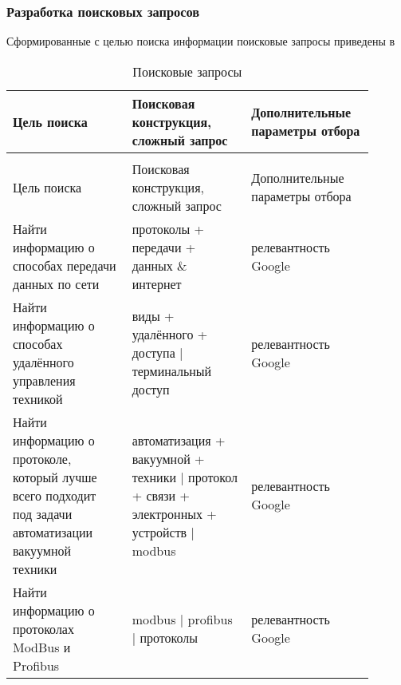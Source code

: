 \subsubsection{Разработка поисковых запросов}
Сформированные с целью поиска информации поисковые запросы приведены в 


\begin{center}
	\begin{longtable}{|C{0.3\linewidth}|C{0.3\linewidth}|C{0.3\linewidth}|}
		\caption{Поисковые запросы}
		\label{tab:search}\\
		\hline
		\bfseries  Цель поиска &\bfseries Поисковая конструкция, сложный запрос& \bfseries Дополнительные параметры отбора\\
		\endfirsthead
		\cpt\\
		\hline
		Цель поиска& Поисковая конструкция, сложный запрос& Дополнительные параметры отбора\\
		\endhead
		\hline
		Найти информацию о способах передачи данных по сети &протоколы + передачи + данных \& интернет&релевантность Google\\
		\hline
		Найти информацию о способах удалённого управления техникой&виды + удалённого + доступа | терминальный доступ&релевантность Google\\
		\hline
		Найти информацию о протоколе, который лучше всего подходит под задачи автоматизации вакуумной техники & автоматизация + вакуумной + техники | протокол + связи + электронных + устройств | modbus& релевантность Google\\		
		\hline
		Найти информацию о протоколах ModBus и Profibus & modbus | profibus | протоколы & релевантность Google\\
		\hline
	\end{longtable}
\end{center}

